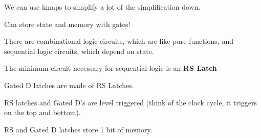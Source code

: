 
We can use kmaps to simplify a lot of the simplification down.

Can store state and memory with gates!

There are combinational logic circuits, which are like pure functions, and sequential logic circuits, which depend on state.

The minimum circuit necessary for sequential logic is an \textbf{RS Latch}

Gated D latches are made of RS Latches.

RS latches and Gated D's are level triggered (think of the clock cycle, it triggers on the top and bottom).

RS and Gated D latches store 1 bit of memory.
